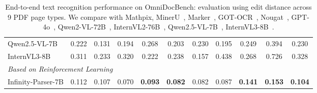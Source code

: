 \begin{table}[h]
{\begin{tabular}{l ccccccccc |c}
      Qwen2.5-VL-7B & 0.222 & 0.131 & 0.194 & 0.268 & 0.203 & 0.230 & 0.195 & 0.249 & 0.394 & 0.230 \\
      

      InternVL3-8B & 0.311 & 0.233 & 0.320 & 0.222 & 0.238 & 0.157 & 0.438 & 0.268 & 0.726 & 0.328 \\
      
      \midrule
      \multicolumn{11}{l}{\textit{Based on Reinforcement Learning}} \\
      Infinity-Parser-7B
        & 0.112 & 0.107 & 0.070 & \textbf{0.093} & \textbf{0.082} & 0.082 & 0.087 & \textbf{0.141} & \textbf{0.153}& \textbf{0.104} \\
      \bottomrule
    \end{tabular}
  }
  \caption{End-to-end text recognition performance on OmniDocBench: evaluation using edit distance across 9 PDF page types. We compare with Mathpix, MinerU~\citep{MinerU}, Marker~\citep{marker}, GOT-OCR~\citep{got2}, Nougat~\citep{Nougat}, GPT-4o~\citep{GPT3}, Qwen2-VL-72B~\citep{wang2024qwen2}, InternVL2-76B~\citep{InternVL}, Qwen2.5-VL-7B~\citep{bai2025qwen2.5}, InternVL3-8B~\citep{zhu2025internvl3}.}
  \label{result_label2}
\end{table}






 

    
